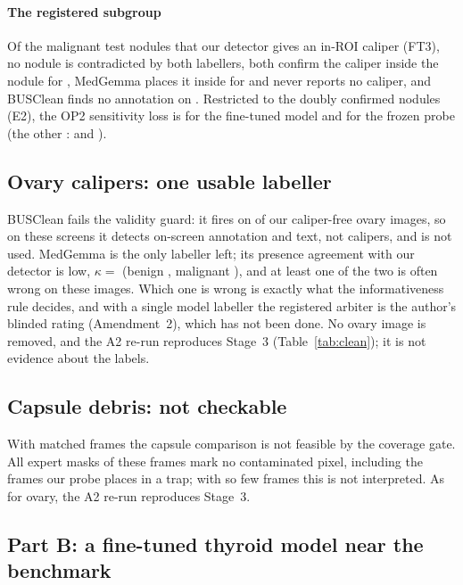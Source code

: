 \paragraph{The registered subgroup} Of the \sEightSubN{} malignant test nodules that our detector gives an in-ROI
caliper (FT3), no nodule is contradicted by both labellers, both confirm the caliper inside the nodule for
\sEightSubConfirmed, MedGemma places it inside for \sEightSubMgIn{} and never reports no caliper, and BUSClean finds no
annotation on \sEightSubBusNone. Restricted to the \sEightEtwoFtConfN{} doubly confirmed nodules (E2), the OP2 sensitivity loss is \sEightEtwoFtConf{}
for the fine-tuned model and \sEightEtwoFrozenConf{} for the frozen probe (the other \sEightEtwoFtRestN: \sEightEtwoFtRest{}
and \sEightEtwoFrozenRest).

\subsection{Ovary calipers: one usable labeller}
BUSClean fails the validity guard: it fires on \sEightOvBusFreePos{} of our caliper-free ovary images, so on these screens
it detects on-screen annotation and text, not calipers, and is not used. MedGemma is the only labeller left; its presence
agreement with our detector is low, $\kappa=$ \sEightOvMgKappa{} (benign \sEightOvMgKappaYZero, malignant
\sEightOvMgKappaYOne), and at least one of the two is often wrong on these images. Which one is wrong is exactly what the
informativeness rule decides, and with a single model labeller the registered arbiter is the author's blinded rating
(Amendment~2), which has not been done. No ovary image is removed, and the A2 re-run reproduces Stage~3
(Table~\ref{tab:clean}); it is not evidence about the labels.

\subsection{Capsule debris: not checkable}
With \sEightNCap{} matched frames the capsule comparison is not feasible by the coverage gate. All \sEightCapEmpty{}
expert masks of these frames mark no contaminated pixel, including the \sEightCapTrapCells{} frames our probe places in a
trap; with so few frames this is not interpreted. As for ovary, the A2 re-run reproduces Stage~3.

\subsection{Part B: a fine-tuned thyroid model near the benchmark}
